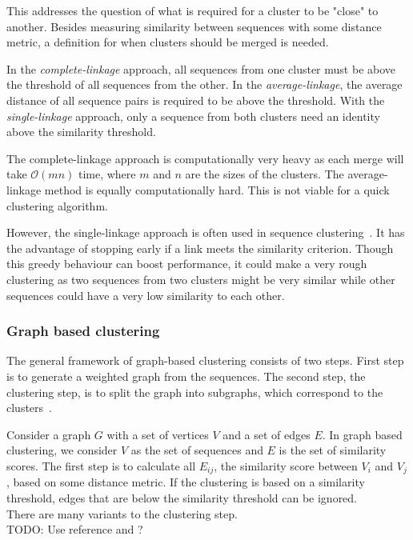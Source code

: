 This addresses the question of what is required for a cluster to be "close" to
another. Besides measuring similarity between sequences with some distance
metric, a definition for when clusters should be merged is needed.

In the \textit{complete-linkage} approach, all sequences from one cluster 
must be above the threshold of all sequences from the other. In the
\textit{average-linkage}, the average distance of all sequence pairs is
required to be above the threshold. With the \textit{single-linkage} 
approach, only a sequence from both clusters need an identity above the similarity threshold. 

The complete-linkage approach is computationally very heavy as each merge 
will take $\mathcal{O}(mn)$ time, where $m$ and $n$ are the sizes of the 
clusters. The average-linkage method is equally computationally hard. This is 
not viable for a quick clustering algorithm.

However, the single-linkage approach is often used in sequence 
clustering~\cite[pp. 62-63]{dong}. It has the advantage of stopping early if 
a link meets the similarity criterion. Though this greedy behaviour can boost 
performance, it could make a very rough clustering as two sequences from two 
clusters might be very similar while other sequences could have a very low 
similarity to each other.

\subsubsection{Graph based clustering}
The general framework of graph-based clustering consists of two steps. First 
step is to generate a weighted graph from the sequences. The second step, the 
clustering step, is to split the graph into subgraphs, which correspond to 
the clusters~\cite[pp. 64-65]{dong}.

Consider a graph $G$ with a set of vertices $V$ and a set of edges $E$. In 
graph based clustering, we consider $V$ as the set of sequences and $E$ is 
the set of similarity scores.
The first step is to calculate all $E_{ij}$, the similarity score between 
$V_i$ and $V_j$, based on some distance metric. If the clustering is based on 
a similarity threshold, edges that are below the similarity threshold can be ignored. \\
There are many variants to the clustering step.\\
TODO: Use reference \cite{hartuv} and \cite{kawaji}?




